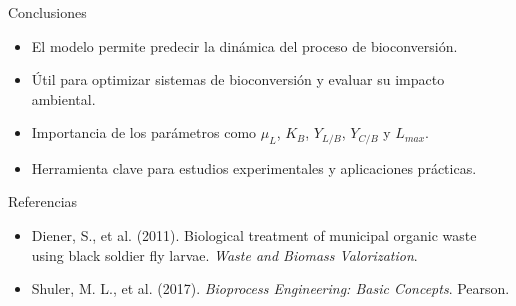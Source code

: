 \documentclass{beamer}
\begin{document}
\begin{frame}{Conclusiones}
    \begin{itemize}
        \item El modelo permite predecir la dinámica del proceso de bioconversión.
        \item Útil para optimizar sistemas de bioconversión y evaluar su impacto ambiental.
        \item Importancia de los parámetros como $\mu_L$, $K_B$, $Y_{L/B}$, $Y_{C/B}$ y $L_{max}$.
        \item Herramienta clave para estudios experimentales y aplicaciones prácticas.
    \end{itemize}
\end{frame}

\begin{frame}{Referencias}
    \begin{itemize}
        \item Diener, S., et al. (2011). Biological treatment of municipal organic waste using black soldier fly larvae. \textit{Waste and Biomass Valorization}.
        \item Shuler, M. L., et al. (2017). \textit{Bioprocess Engineering: Basic Concepts}. Pearson.
    \end{itemize}
\end{frame}
\end{document}
